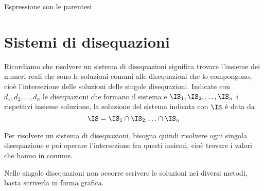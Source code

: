 \begin{esempio}
\begin{itemize}
\begin{minipage}{.32\textwidth}
 \begin{center}
  
  \vspace{1em}
 \end{center}
  \end{minipage}
  \begin{minipage}{.32\textwidth}
  Espressione con le parentesi\\[-.3em]
  
 \begin{center}
  
  \vspace{.8em}
 \end{center}
  \end{minipage}
  
\end{itemize}
\end{esempio}

% 

\section{Sistemi di disequazioni}
\label{sec:diseq_sistemi}

Ricordiamo che risolvere un sistema di disequazioni significa trovare 
l'insieme dei numeri reali che sono le soluzioni comuni alle disequazioni che 
lo compongono, cioè l'intersezione delle soluzioni delle singole 
disequazioni. 
Indicate con \(d_{1}, d_{2}, \ldots, d_n\) le disequazioni che formano 
il sistema e \(\IS_{1}, \IS_{2}, \ldots,\IS_n\) i rispettivi insieme 
soluzione, la soluzione del sistema indicata con \(\IS\) è data da 
\[\IS=\IS_1 \cap \IS_{2,} \ldots \cap \IS_n\]

Per risolvere un sistema di disequazioni, bisogna quindi risolvere ogni 
singola disequazione e poi operare l'intersezione fra questi insiemi, cioè 
trovare i valori che hanno in comune.

\begin{osservazione}
 Nelle singole disequazioni non occorre scrivere le soluzioni nei diversi 
metodi, basta scriverla in forma grafica.
\end{osservazione}


